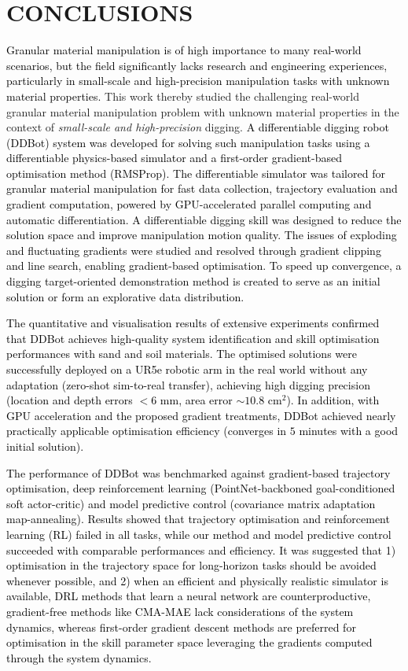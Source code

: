 \documentclass[letterpaper, 10 pt, journal, twoside]{ieeetran}
\newcommand{\rp}[1]{\textcolor{black}{#1}}
\begin{document}
\section{CONCLUSIONS}\label{sec:conclude}
\rp{Granular material manipulation is of high importance to many real-world scenarios, but the field significantly lacks research and engineering experiences, particularly in small-scale and high-precision manipulation tasks with unknown material properties.} This work thereby studied the challenging real-world granular material manipulation problem with unknown material properties in the context of \textit{small-scale and high-precision} digging. \rp{A differentiable digging robot (DDBot) system was developed for solving such manipulation tasks using a differentiable physics-based %
simulator and a first-order gradient-based optimisation method (RMSProp). The differentiable simulator was tailored for granular material manipulation for fast data collection, trajectory evaluation and gradient computation, powered by GPU-accelerated parallel computing and automatic differentiation. A differentiable digging skill was designed to reduce the solution space and improve manipulation motion quality. The issues of exploding and fluctuating gradients were studied and resolved through gradient clipping and line search, enabling gradient-based optimisation. To speed up convergence, a digging target-oriented demonstration method is created to serve as an initial solution or form an explorative data distribution.}

\rp{The quantitative and visualisation results of extensive experiments confirmed that DDBot achieves high-quality system identification and skill optimisation performances with sand and soil materials. The optimised solutions were successfully deployed on a UR5e robotic arm in the real world without any adaptation (zero-shot sim-to-real transfer), achieving high digging precision (location and depth errors $<6$ mm, area error $\sim10.8$ cm$^2$). In addition, with GPU acceleration and the proposed gradient treatments, DDBot achieved nearly practically applicable optimisation efficiency (converges in $5$ minutes with a good initial solution).} 

\rp{The performance of DDBot was benchmarked against gradient-based trajectory optimisation, deep reinforcement learning (PointNet-backboned goal-conditioned soft actor-critic) and model predictive control (covariance matrix adaptation map-annealing). Results showed that trajectory optimisation and reinforcement learning (RL) failed in all tasks, while our method and model predictive control succeeded with comparable performances and efficiency. It was suggested that 1) optimisation in the trajectory space for long-horizon tasks should be avoided whenever possible, and 2) when an efficient and physically realistic simulator is available, DRL methods that learn a neural network are counterproductive, gradient-free methods like CMA-MAE lack considerations of the system dynamics, whereas first-order gradient descent methods are preferred for optimisation in the skill parameter space leveraging the gradients computed through the system dynamics.}
\end{document}
